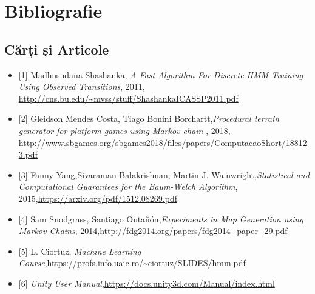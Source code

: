 \chapter*{Bibliografie} 
\section{Cărți și Articole}
\begin{itemize}
    \item{[1] Madhusudana Shashanka, \textit{A Fast Algorithm For Discrete HMM Training Using Observed Transitions}, 2011, \newline \url{http://cns.bu.edu/~mvss/stuff/ShashankaICASSP2011.pdf}}
    \item{[2] Gleidson Mendes Costa, Tiago Bonini Borchartt,\newline \textit{Procedural terrain generator for platform games using Markov chain
}, 2018,  \url{http://www.sbgames.org/sbgames2018/files/papers/ComputacaoShort/188123.pdf}}
	\item{[3] Fanny Yang,Sivaraman Balakrishnan, Martin J. Wainwright,\newline \textit{Statistical and Computational Guarantees for the
Baum-Welch Algorithm}, 2015,\newline \url{https://arxiv.org/pdf/1512.08269.pdf}}
	\item{[4] Sam Snodgrass, Santiago Ontañón,\newline \textit{Experiments in Map Generation using Markov Chains}, 2014,\newline \url{http://fdg2014.org/papers/fdg2014_paper_29.pdf}}
	\item {[5] L. Ciortuz, \textit{Machine Learning Course},\newline \url{https://profs.info.uaic.ro/~ciortuz/SLIDES/hmm.pdf}}
	\item{[6] \textit{Unity User Manual},\newline \url{https://docs.unity3d.com/Manual/index.html}}
\end{itemize}

\pagebreak

